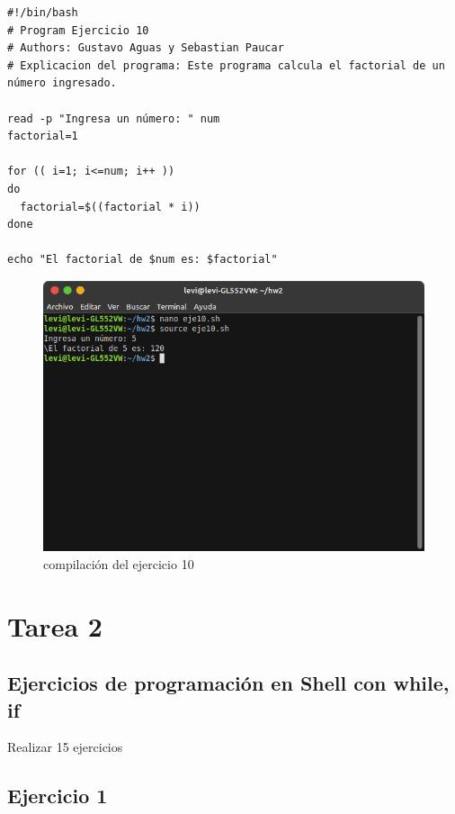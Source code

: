 \documentclass[11pt,twoside]{book}
\begin{document}
\begin{lstlisting}
#!/bin/bash
# Program Ejercicio 10
# Authors: Gustavo Aguas y Sebastian Paucar
# Explicacion del programa: Este programa calcula el factorial de un número ingresado.

read -p "Ingresa un número: " num
factorial=1

for (( i=1; i<=num; i++ ))
do
  factorial=$((factorial * i))
done

echo "El factorial de $num es: $factorial"
\end{lstlisting}
\begin{figure}[h]
    \centering
    \includegraphics[width=0.8\linewidth]{Tarea2/teje10.png}
    \caption{ compilación del ejercicio 10}
\end{figure}

\newpage
\section{Tarea 2}

\subsection{Ejercicios de programación en Shell con while, if}

Realizar 15 ejercicios

\subsection{Ejercicio 1}
\end{document}
